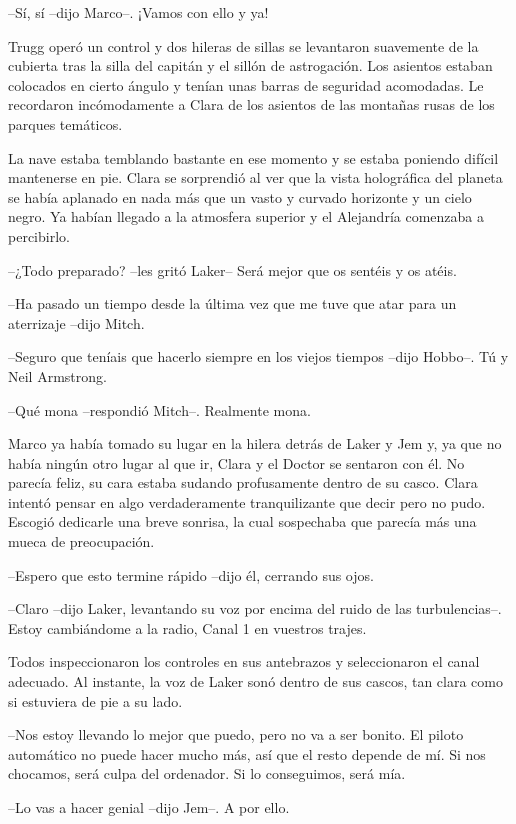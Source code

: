 {--Sí, sí --dijo Marco--. ¡Vamos con ello y ya!}

{Trugg operó un control y dos hileras de sillas se levantaron suavemente
 de la cubierta tras la silla del capitán y el sillón de astrogación. Los
 asientos estaban colocados en cierto ángulo y tenían unas barras de
 seguridad acomodadas. Le recordaron incómodamente a Clara de los
asientos de las montañas rusas de los parques temáticos.}

{La nave estaba temblando bastante en ese momento y se estaba poniendo
 difícil mantenerse en pie. Clara se sorprendió al ver que la vista
 holográfica del planeta se había aplanado en nada más que un vasto y
 curvado horizonte y un cielo negro. Ya habían llegado a la atmosfera
superior y el Alejandría comenzaba a percibirlo.}

{--¿Todo preparado? --les gritó Laker-- Será mejor que os sentéis y os
atéis.}

{--Ha pasado un tiempo desde la última vez que me tuve que atar para un
aterrizaje --dijo Mitch.}

{--Seguro que teníais que hacerlo siempre en los viejos tiempos --dijo
Hobbo--. Tú y Neil Armstrong.}

{--Qué mona --respondió Mitch--. Realmente mona.}

{Marco ya había tomado su lugar en la hilera detrás de Laker y Jem y, ya
 que no había ningún otro lugar al que ir, Clara y el Doctor se sentaron
 con él. No parecía feliz, su cara estaba sudando profusamente dentro de
 su casco. Clara intentó pensar en algo verdaderamente tranquilizante que
 decir pero no pudo. Escogió dedicarle una breve sonrisa, la cual
sospechaba que parecía más una mueca de preocupación.}

{--Espero que esto termine rápido --dijo él, cerrando sus ojos.}

{--Claro --dijo Laker, levantando su voz por encima del ruido de las
 turbulencias--. Estoy cambiándome a la radio, Canal 1 en vuestros
trajes.}

{Todos inspeccionaron los controles en sus antebrazos y seleccionaron el
 canal adecuado. Al instante, la voz de Laker sonó dentro de sus cascos,
tan clara como si estuviera de pie a su lado.}

{--Nos estoy llevando lo mejor que puedo, pero no va a ser bonito. El
 piloto automático no puede hacer mucho más, así que el resto depende de
 mí. Si nos chocamos, será culpa del ordenador. Si lo conseguimos, será
mía.}

{--Lo vas a hacer genial --dijo Jem--. A por ello.}

